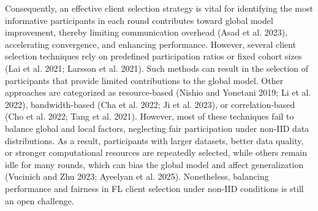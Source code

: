 \documentclass[pdflatex,sn-mathphys-num,oneside]{sn-jnl}%
\theoremstyle{thmstyleone}%
\theoremstyle{thmstyletwo}%
\theoremstyle{thmstylethree}%
\begin{document}
Consequently, an effective client selection strategy is vital for identifying the most informative participants in each round contributes toward global model improvement, thereby limiting communication overhead (Asad et al. 2023), accelerating convergence, and enhancing performance. However, several client selection techniques rely on predefined participation ratios or fixed cohort sizes (Lai et al. 2021; Larsson et al. 2021). Such methods can result in the selection of participants that provide limited contributions to the global model. Other approaches are categorized as resource-based (Nishio and Yonetani 2019; Li et al. 2022), bandwidth-based (Cha et al. 2022; Ji et al. 2023), or correlation-based (Cho et al. 2022; Tang et al. 2021). However, most of these techniques fail to balance global and local factors, neglecting fair participation under non-IID data distributions. As a result, participants with larger datasets, better data quality, or stronger computational resources are repeatedly selected, while others remain idle for many rounds, which can bias the global model and affect generalization (Vucinich and Zhu 2023; Ayeelyan et al. 2025). Nonetheless, balancing performance and fairness in FL client selection under non-IID conditions is still an open challenge.
\end{document}
